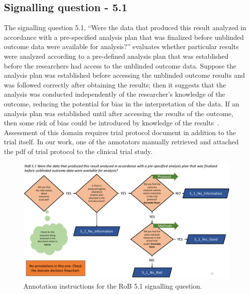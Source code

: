 \documentclass[sn-mathphys,Numbered]{sn-jnl}%
\begin{document}
\subsection*{Signalling question - 5.1 }
\label{subsec:5_1}
%
The signalling question 5.1, ``Were the data that produced this result analyzed in accordance with a pre-specified analysis plan that was finalized before unblinded outcome data were available for analysis?'' evaluates whether particular results were analyzed according to a pre-defined analysis plan that was established before the researchers had access to the unblinded outcome data.
Suppose the analysis plan was established before accessing the unblinded outcome results and was followed correctly after obtaining the results; then it suggests that the analysis was conducted independently of the researcher's knowledge of the outcome, reducing the potential for bias in the interpretation of the data.
If an analysis plan was established until after accessing the results of the outcome, then some risk of bias could be introduced by knowledge of the results~\cite{riiser2022cycling}. %
Assessment of this domain requires trial protocol document in addition to the trial itself.
In our work, one of the annotators manually retrieved and attached the pdf of trial protocol to the clinical trial study.
%
%
%
\begin{figure}[htbp]
    \centering
    \includegraphics[width=\textwidth]{figures/5_1.pdf}
    \caption{Annotation instructions for the RoB 5.1 signalling question.}
    \label{fig:5_1}
\end{figure}
%
%
%
\end{document}
